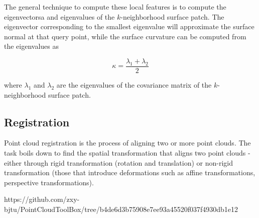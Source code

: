 The general technique to compute these local features is to compute the eigenvectorsa and eigenvalues of the $k$-neighborhood surface patch. The eigenvector corresponding to the smallest eigenvalue will approximate the surface normal at that query point, while the surface curvature can be computed from the eigenvalues as

$$
\kappa = \frac{\lambda_1 + \lambda_2}{2}
$$

where $\lambda_1$ and $\lambda_2$ are the eigenvalues of the covariance matrix of the $k$-neighborhood surface patch.

\subsection{Registration}
Point cloud registration is the process of aligning two or more point clouds. The task boils down to find the spatial transformation that aligns two point clouds - either through rigid transformation (rotation and translation) or non-rigid transformation (those that introduce deformations such as affine transformations, perspective transformations).

https://github.com/zxy-bjtu/PointCloudToolBox/tree/b4de6d3b75908e7ee93a45520f037f4930db1e12

\nocite{*}




